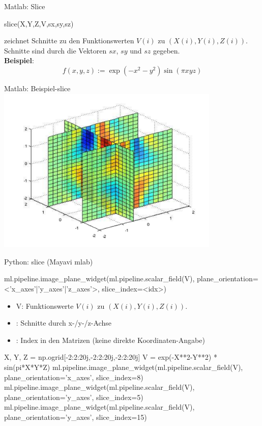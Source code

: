 \documentclass[hyperref={xetex}]{beamer}
\begin{document}
%
% 
\begin{frame}[fragile]{Matlab: Slice}
\begin{matlabin}
slice(X,Y,Z,V,sx,sy,sz)
\end{matlabin}
zeichnet  Schnitte zu den Funktionswerten $V(i)$ zu
$(X(i),Y(i),Z(i))$. Schnitte sind durch die Vektoren $sx$, $sy$ und $sz$
gegeben.\\
\textbf{Beispiel}: \alert{ \[ f(x,y,z):=\exp(-x^2-y^2)\sin(\pi x y z) \]}
\end{frame}

\begin{frame}[fragile]{Matlab: Beispiel-slice}
\hfil\includegraphics[width=0.8\textwidth]{figures/slice}\hfil
\end{frame}

\begin{frame}[fragile]{Python: slice (Mayavi mlab)}
  \begin{pyin}
ml.pipeline.image_plane_widget(ml.pipeline.scalar_field(V), plane_orientation=<'x_axes'|'y_axes'|'z_axes'>, slice_index=<idx>)    
  \end{pyin}
  \begin{itemize}
    \item V: Funktionswerte $V(i)$ zu $(X(i),Y(i),Z(i))$.
    \item {}: Schnitte durch x-/y-/z-Achse
    \item {}: Index in den Matrizen (keine direkte Koordinaten-Angabe)
  \end{itemize}

  \begin{pyin}
X, Y, Z = np.ogrid[-2:2:20j,-2:2:20j,-2:2:20j]
V = exp(-X**2-Y**2) * sin(pi*X*Y*Z)
ml.pipeline.image_plane_widget(ml.pipeline.scalar_field(V), plane_orientation='x_axes', slice_index=8)
ml.pipeline.image_plane_widget(ml.pipeline.scalar_field(V), plane_orientation='y_axes', slice_index=5)
ml.pipeline.image_plane_widget(ml.pipeline.scalar_field(V), plane_orientation='y_axes', slice_index=15)    
  \end{pyin}

\end{frame}
\end{document}
